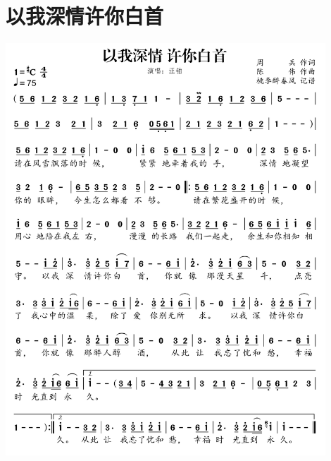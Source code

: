 \documentclass[cn,pad,twocol]{elegantbook}
\begin{document}
\section{以我深情许你白首} \includegraphics[width=0.9\textwidth]{rpi400/20210212以我深情许你白首.png}
\end{document}
